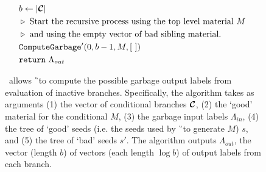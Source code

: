 \begin{figure}
\begin{align*}
    \\
    &~~b \gets |\vec{\cir}|\\
    &~~\codecomment{Start the recursive process using the top level material $\mat$}\\
    &~~\codecomment{and using the empty vector of bad sibling material.}\\
    &~~\computegarbage'(0, b-1, \mat, [~])\\
    &~~\creturn~\Lambda_{out}
  \end{align*}
  \caption{%
    \computegarbage\ allows \G\ to compute the possible garbage output labels
    from evaluation of inactive branches.
    Specifically, the algorithm takes as arguments (1) the vector of
    conditional branches $\vec{\cir}$, (2) the `good' material for the
    conditional $M$, (3) the garbage input labels $\Lambda_{in}$, (4)
    the tree of `good' seeds (i.e. the seeds used by \G\ to generate
    $M$) $s$, and (5) the tree of `bad' seeds $s'$.
    The algorithm outputs $\Lambda_{out}$, the vector (length $b$) of
    vectors (each length $\log b$) of output labels from each
    branch.
  }\label{fig:computegarbage}
\end{figure}

